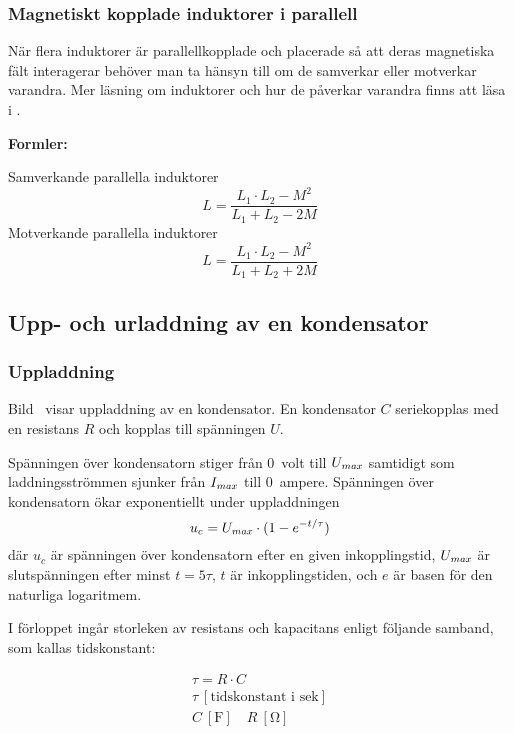 \subsubsection{Magnetiskt kopplade induktorer i parallell}
När flera induktorer är parallellkopplade och placerade så att deras magnetiska
fält interagerar behöver man ta hänsyn till om de samverkar eller motverkar varandra.
Mer läsning om induktorer och hur de påverkar varandra finns att läsa i
\cite{letrafo}.

\textbf{Formler:}

Samverkande parallella induktorer
%
\[L = \frac{L_1 \cdot L_2 - M^2}{L_1 + L_2 - 2M}\]
%
Motverkande parallella induktorer
%
\[L = \frac{L_1 \cdot L_2 - M^2}{L_1 + L_2 + 2M}\]
%
\subsection{Upp- och urladdning av en kondensator}

\subsubsection{Uppladdning}


Bild~ visar uppladdning av en kondensator.
En kondensator \(C\) seriekopplas med en resistans \(R\)
och kopplas till spänningen \(U\).

Spänningen över kondensatorn stiger från 0~volt till \(U_{\it max}\) samtidigt
som laddningsströmmen sjunker från \(I_{\it max}\) till 0~ampere.
Spänningen över kondensatorn ökar exponentiellt under uppladdningen
%
\[u_c = U_{\it max} \cdot ( 1 - e^{-t/\tau} )\]
%
där \(u_c\) är spänningen över kondensatorn efter en given inkopplingstid, \(U_{\it max}\)
är slutspänningen efter minst \(t = 5\tau\), \(t\) är inkopplingstiden, och \(e\) är basen
för den naturliga logaritmem.

I förloppet ingår storleken av resistans och kapacitans enligt följande samband,
som kallas tidskonstant:

\begin{gather*}
  \tau = R \cdot C \\
  \tau\ [\text{tidskonstant i sek}] \\
  C\ [\text{F}] \quad R\ [\unit{\ohm}]
\end{gather*}

